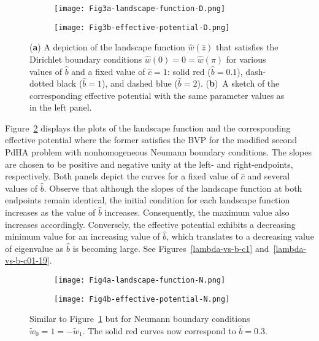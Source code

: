 \documentclass[symmetry,article,accept,moreauthors,pdftex,a4paper]{mdpi}
\begin{document}
\begin{figure}[H]
\widefigure
\begin{subfigure}{0.45\textwidth}
\caption{} \vspace{0.1cm}
\texttt{[image: Fig3a-landscape-function-D.png]}
\end{subfigure}	\hspace*{0.5cm}
\begin{subfigure}{0.45\textwidth}
\caption{} \vspace{0.1cm}
\texttt{[image: Fig3b-effective-potential-D.png]}
\end{subfigure}
\caption{(\textbf{a}) A depiction of the landscape function $\widehat{w}(\widehat{z})$ that satisfies the Dirichlet boundary conditions $\widehat{w}(0) = 0 = \widehat{w}(\pi)$ for various values of $\widehat{b}$ and a fixed value of $\widehat{c} = 1$: solid red ($\widehat{b} = 0.1$), dash-dotted black ($\widehat{b} = 1$), and dashed blue ($\widehat{b} = 2$). (\textbf{b})~A sketch of the corresponding effective potential with the same parameter values as in the left panel.}	\label{lfep-D}
\end{figure}
\begin{paracol}{2}
\switchcolumn

Figure~\ref{lfep-N} displays the plots of the landscape function and the corresponding effective potential where the former satisfies the BVP for the modified second PdHA problem with nonhomogeneous Neumann boundary conditions. The slopes are chosen to be positive and negative unity at the left- and right-endpoints, respectively. Both panels depict the curves for a fixed value of $\widehat{c}$ and several values of $\widehat{b}$. Observe that although the slopes of the landscape function at both endpoints remain identical, the initial condition for each landscape function increases as the value of $\widehat{b}$ increases. Consequently, the maximum value also increases accordingly. Conversely, the effective potential exhibits a decreasing minimum value for an increasing value of $\widehat{b}$, which translates to a decreasing value of eigenvalue as $\widehat{b}$ is becoming large. See Figures~\ref{lambda-vs-b-c1} and~\ref{lambda-vs-b-c01-19}.

\end{paracol}
\nointerlineskip
\begin{figure}[H]
\widefigure
\begin{subfigure}{0.45\textwidth}
\caption{} \vspace{0.1cm}
\texttt{[image: Fig4a-landscape-function-N.png]}
\end{subfigure}	\hspace*{0.5cm}
\begin{subfigure}{0.45\textwidth}
\caption{} \vspace{0.1cm}
\texttt{[image: Fig4b-effective-potential-N.png]}
\end{subfigure}
\caption{Similar to Figure~\ref{lfep-D} but for Neumann boundary conditions $\widetilde{w}_0 = 1 = -\widetilde{w}_1$. The solid red curves now correspond to $\widehat{b} = 0.3$.}	\label{lfep-N}
\end{figure}
\end{document}
